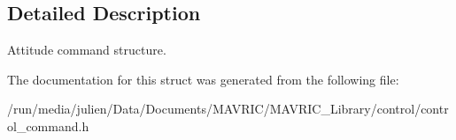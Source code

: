 \subsection{Detailed Description}
Attitude command structure. 

The documentation for this struct was generated from the following file\+:\begin{DoxyCompactItemize}
\item 
/run/media/julien/\+Data/\+Documents/\+M\+A\+V\+R\+I\+C/\+M\+A\+V\+R\+I\+C\+\_\+\+Library/control/control\+\_\+command.\+h\end{DoxyCompactItemize}
